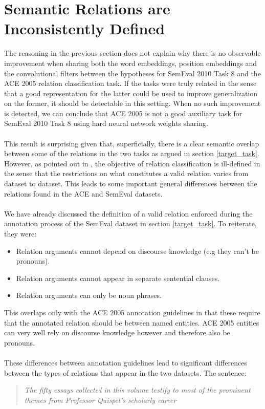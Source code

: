 \section{Semantic Relations are Inconsistently Defined}
The reasoning in the previous section does not explain why there is no observable improvement when sharing both the word embeddings, position embeddings and the convolutional filters between the hypotheses for SemEval 2010 Task 8 and the ACE 2005 relation classification task. If the tasks were truly related in the sense that a good representation for the latter could be used to improve generalization on the former, it should be detectable in this setting. When no such improvement is detected, we can conclude that ACE 2005 is not a good auxiliary task for SemEval 2010 Task 8 using hard neural network weights sharing.
\\\\
This result is surprising given that, superficially, there is a clear semantic overlap between some of the relations in the two tasks as argued in section \ref{target_task}. However, as pointed out in \citet{handschuh2016}, the objective of relation classification is ill-defined in the sense that the restrictions on what constitutes a valid relation varies from dataset to dataset. This leads to some important general differences between the relations found in the ACE and SemEval datasets.
\\\\
We have already discussed the definition of a valid relation enforced during the annotation process of the SemEval dataset in section \ref{target_task}. To reiterate, they were:
\begin{itemize}
	\item Relation arguments cannot depend on discourse knowledge (e.g they can't be pronouns).
	\item Relation arguments cannot appear in separate sentential clauses.
	\item Relation arguments can only be noun phrases.
\end{itemize}
This overlaps only with the ACE 2005 annotation guidelines in that these require that the annotated relation should be between named entities. ACE 2005 entities can very well rely on discourse knowledge however and therefore also be pronouns.
\\\\
These differences between annotation guidelines lead to significant differences between the types of relations that appear in the two datasets. The sentence: 
\begin{quote}
\textit{The fifty essays collected in this volume testify to most of the prominent themes from Professor Quispel's scholarly career}	
\end{quote}

